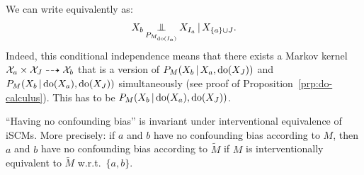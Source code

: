 \begin{Rem}\label{rem:no_confounding_bias}
  We can write  equivalently as:
  $$X_b \operatorname*{\perp\mkern-11mu\perp}_{P_{M_{\operatorname{do}(I_a)}}} X_{I_a} \operatorname*{|} X_{\{a\} \cup J}.$$
  Indeed, this conditional independence means that there exists a Markov kernel
  $\mathcal{X}_a \times \mathcal{X}_J \dashrightarrow \mathcal{X}_b$
  that is a version of $P_M(X_b\operatorname*{|} X_a,\operatorname{do}(X_J))$ and $P_M(X_b\operatorname*{|} \operatorname{do}(X_a),\operatorname{do}(X_J))$ simultaneously
  (see proof of Proposition~\ref{prp:do-calculus}).
  This has to be $P_M(X_b \operatorname*{|} \operatorname{do}(X_a),\operatorname{do}(X_J))$. 
\end{Rem}
\begin{Rem}\label{rem:scm_no_confounding_bias_interventional_equivalence}
  ``Having no confounding bias'' is invariant under interventional equivalence of iSCMs.
  More precisely: if $a$ and $b$ have no confounding bias according to $M$, then $a$ and $b$ have no confounding bias according to $\tilde{M}$ if $M$ is interventionally equivalent to $\tilde{M}$ w.r.t.\ $\{a,b\}$.
\end{Rem}

